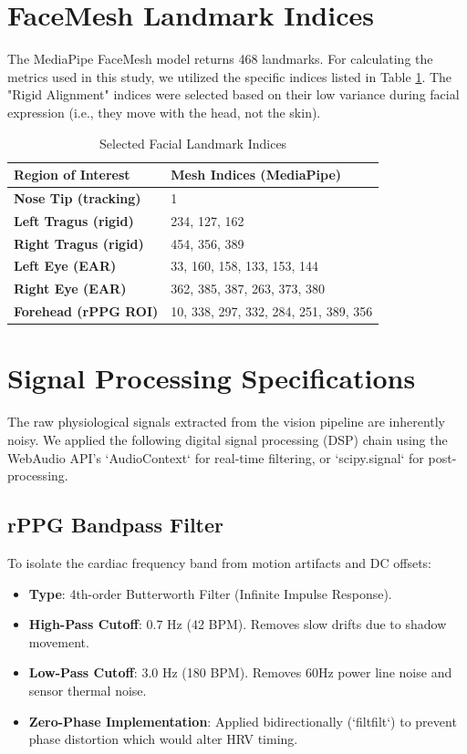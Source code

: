 \documentclass[journal]{IEEEtran}
\begin{document}
\appendices

\section{FaceMesh Landmark Indices}
The MediaPipe FaceMesh model returns 468 landmarks. For calculating the metrics used in this study, we utilized the specific indices listed in Table \ref{tab:landmarks}.
The "Rigid Alignment" indices were selected based on their low variance during facial expression (i.e., they move with the head, not the skin).

\begin{table}[h]
\caption{Selected Facial Landmark Indices}
\label{tab:landmarks}
\centering
\begin{tabular}{ll}
\bottomrule
\textbf{Region of Interest} & \textbf{Mesh Indices (MediaPipe)} \\ 
\toprule
\textbf{Nose Tip (tracking)} & 1 \\
\textbf{Left Tragus (rigid)} & 234, 127, 162 \\
\textbf{Right Tragus (rigid)} & 454, 356, 389 \\
\textbf{Left Eye (EAR)} & 33, 160, 158, 133, 153, 144 \\
\textbf{Right Eye (EAR)} & 362, 385, 387, 263, 373, 380 \\
\textbf{Forehead (rPPG ROI)} & 10, 338, 297, 332, 284, 251, 389, 356 \\
\bottomrule
\end{tabular}
\end{table}

\section{Signal Processing Specifications}
The raw physiological signals extracted from the vision pipeline are inherently noisy. 
We applied the following digital signal processing (DSP) chain using the WebAudio API's `AudioContext` for real-time filtering, or `scipy.signal` for post-processing.

\subsection{rPPG Bandpass Filter}
To isolate the cardiac frequency band from motion artifacts and DC offsets:
\begin{itemize}
    \item \textbf{Type}: 4th-order Butterworth Filter (Infinite Impulse Response).
    \item \textbf{High-Pass Cutoff}: 0.7 Hz (42 BPM). Removes slow drifts due to shadow movement.
    \item \textbf{Low-Pass Cutoff}: 3.0 Hz (180 BPM). Removes 60Hz power line noise and sensor thermal noise.
    \item \textbf{Zero-Phase Implementation}: Applied bidirectionally (`filtfilt`) to prevent phase distortion which would alter HRV timing.
\end{itemize}
\end{document}
